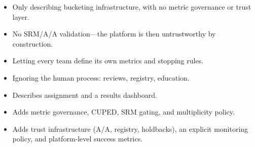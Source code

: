 \begin{interviewq}
\redflags
\begin{itemize}
    \item Only describing bucketing infrastructure, with no metric governance or trust layer.
    \item No SRM/A/A validation---the platform is then untrustworthy by construction.
    \item Letting every team define its own metrics and stopping rules.
    \item Ignoring the human process: reviews, registry, education.
\end{itemize}


\goodgreat
\begin{itemize}
    \item {} Describes assignment and a results dashboard.
    \item {} Adds metric governance, CUPED, SRM gating, and multiplicity policy.
    \item {} Adds trust infrastructure (A/A, registry, holdbacks), an explicit monitoring policy, and platform-level success metrics.
\end{itemize}

\end{interviewq}
